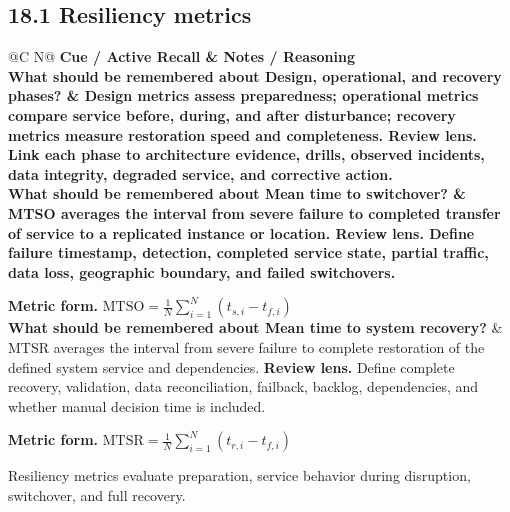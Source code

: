 \documentclass[11pt]{article}
\newcommand{\CornellHeader}{\rowcolor{Navy}\color{white}\bfseries Cue / Active Recall & \color{white}\bfseries Notes / Reasoning \\\endhead}
\newcommand{\CornellRow}[2]{\cellcolor{CueGray}\textbf{#1} & #2 \\\addlinespace[3pt]}
\begin{document}
\subsection{18.1 Resiliency metrics}
\begin{longtable}{@{}C N@{}}
\CornellHeader
\CornellRow{What should be remembered about Design, operational, and recovery phases?}{Design metrics assess preparedness; operational metrics compare service before, during, and after disturbance; recovery metrics measure restoration speed and completeness. \textbf{Review lens.} Link each phase to architecture evidence, drills, observed incidents, data integrity, degraded service, and corrective action.}
\CornellRow{What should be remembered about Mean time to switchover?}{MTSO averages the interval from severe failure to completed transfer of service to a replicated instance or location. \textbf{Review lens.} Define failure timestamp, detection, completed service state, partial traffic, data loss, geographic boundary, and failed switchovers.\par\smallskip\textbf{Metric form.} \(\displaystyle \mathrm{MTSO}=\frac{1}{N}\sum_{i=1}^{N}(t_{s,i}-t_{f,i})\)}
\CornellRow{What should be remembered about Mean time to system recovery?}{MTSR averages the interval from severe failure to complete restoration of the defined system service and dependencies. \textbf{Review lens.} Define complete recovery, validation, data reconciliation, failback, backlog, dependencies, and whether manual decision time is included.\par\smallskip\textbf{Metric form.} \(\displaystyle \mathrm{MTSR}=\frac{1}{N}\sum_{i=1}^{N}(t_{r,i}-t_{f,i})\)}
\end{longtable}
\begin{sectionsummarybox}
Resiliency metrics evaluate preparation, service behavior during disruption, switchover, and full recovery.
\end{sectionsummarybox}
\end{document}
